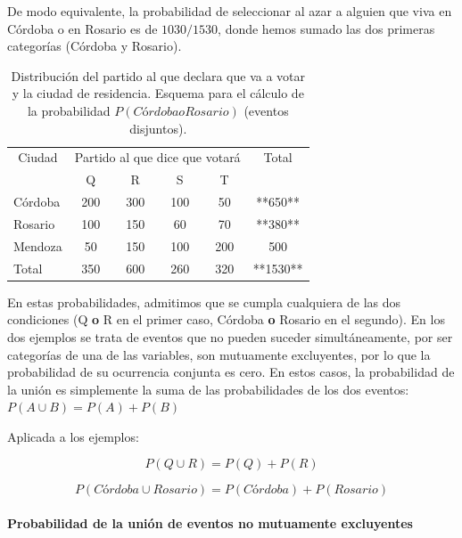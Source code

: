 \documentclass[]{article}
\let\oldparagraph\paragraph
\renewcommand{\paragraph}[1]{\oldparagraph{#1}\mbox{}}
\begin{document}
De modo equivalente, la probabilidad de seleccionar al azar a alguien
que viva en Córdoba o en Rosario es de \(1030/1530\), donde hemos sumado
las dos primeras categorías (Córdoba y Rosario).

\begin{table}

\caption{\label{tab:unnamed-chunk-20}Distribución del partido al que declara que va a votar y la ciudad de residencia. Esquema para el cálculo de la probabilidad $P(Córdoba o Rosario)$ (eventos disjuntos).}
\centering
\begin{tabular}[t]{lccccc}
\toprule
\multicolumn{1}{c}{Ciudad} & \multicolumn{4}{c}{Partido al que dice que votará} & \multicolumn{1}{c}{Total} \\
\cmidrule(l{3pt}r{3pt}){1-1} \cmidrule(l{3pt}r{3pt}){2-5} \cmidrule(l{3pt}r{3pt}){6-6}
 & Q & R & S & T & \\
\midrule
\rowcolor{gray!6}  Córdoba & 200 & 300 & 100 & 50 & **650**\\
Rosario & 100 & 150 & 60 & 70 & **380**\\
\rowcolor{gray!6}  Mendoza & 50 & 150 & 100 & 200 & 500\\
Total & 350 & 600 & 260 & 320 & **1530**\\
\bottomrule
\end{tabular}
\end{table}

En estas probabilidades, admitimos que se cumpla cualquiera de las dos
condiciones (Q \textbf{o} R en el primer caso, Córdoba \textbf{o}
Rosario en el segundo). En los dos ejemplos se trata de eventos que no
pueden suceder simultáneamente, por ser categorías de una de las
variables, son mutuamente excluyentes, por lo que la probabilidad de su
ocurrencia conjunta es cero. En estos casos, la probabilidad de la unión
es simplemente la suma de las probabilidades de los dos eventos:
\(P(A \cup B) = P(A) + P(B)\)

Aplicada a los ejemplos:

\[P(Q \cup R) = P(Q) + P(R)\]

\[P(Córdoba \cup Rosario) = P(Córdoba) + P(Rosario)\]

\hypertarget{probabilidad-de-la-uniuxf3n-de-eventos-no-mutuamente-excluyentes}{%
\paragraph{Probabilidad de la unión de eventos no mutuamente
excluyentes}\label{probabilidad-de-la-uniuxf3n-de-eventos-no-mutuamente-excluyentes}}
\end{document}
